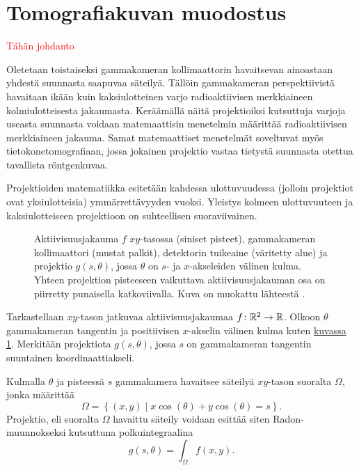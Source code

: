 \section{Tomografiakuvan muodostus}
\textcolor{red}{Tähän johdanto}

Oletetaan toistaiseksi gammakameran kollimaattorin havaitsevan ainoastaan yhdestä suunnasta saapuvaa säteilyä. Tällöin gammakameran perspektiivistä havaitaan ikään kuin kaksiulotteinen varjo radioaktiivisen merkkiaineen kolmiulotteisesta jakaumasta. Keräämällä näitä projektioiksi kutsuttuja varjoja useasta suunnasta voidaan matemaattisin menetelmin määrittää radioaktiivisen merkkiaineen jakauma\cite{cherry_single_2012, bruyant_analytic_2002, beister_iterative_2012, willemink_evolution_2019, van_audenhaege_review_2015, bercovich_medical_2018}. Samat matemaattiset menetelmät soveltuvat myös tietokonetomografiaan, jossa jokainen projektio vastaa tietystä suunnasta otettua tavallista röntgenkuvaa.

Projektioiden matematiikka esitetään kahdessa ulottuvuudessa (jolloin projektiot ovat yksiulotteisia) ymmärrettävyyden vuoksi. Yleistys kolmeen ulottuvuuteen ja kaksiulotteiseen projektioon on suhteellisen suoraviivainen.

\begin{figure}[H]
    \centering
    \captionsetup{width=.9\textwidth}
    
    \caption{Aktiivisuusjakauma $f$ $xy$-tasossa (siniset pisteet), gammakameran kollimaattori (mustat palkit), detektorin tuikeaine (väritetty alue) ja projektio $g(s, \theta)$, jossa $\theta$ on $s$- ja $x$-akseleiden välinen kulma. Yhteen projektion pisteeseen vaikuttava aktiivisuusjakauman osa on piirretty punaisella katkoviivalla. Kuva on muokattu lähteestä \cite{bruyant_analytic_2002}.}
    \label{fig:projektio}
\end{figure}

Tarkastellaan $xy$-tason jatkuvaa aktiivisuusjakaumaa $f\colon\mathbb{R}^{2}\to\mathbb{R}$. Olkoon $\theta$ gammakameran tangentin ja positiivisen $x$-akselin välinen kulma kuten \hyperref[fig:projektio]{kuvassa \ref*{fig:projektio}}. Merkitään projektiota $g(s, \theta)$, jossa $s$ on gammakameran tangentin suuntainen koordinaattiakseli.

Kulmalla $\theta$ ja pisteessä $s$ gammakamera havaitsee säteilyä $xy$-tason suoralta $\Omega$, jonka määrittää
\begin{equation*}
    \Omega=\left\{ (x, y) \mid x\cos(\theta)+y\cos(\theta)=s \right\}.
\end{equation*}
Projektio, eli suoralta $\Omega$ havaittu säteily voidaan esittää siten Radon-muunnokseksi kutsuttuna polkuintegraalina\cite{radon_determination_1986, bruyant_analytic_2002}
\begin{equation}\label{eqn:radon-muunnos}
    g(s, \theta)=\int_{\Omega}f(x, y).
\end{equation}

